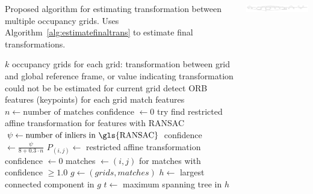 \documentclass[17pt, a0paper, portrait]{tikzposter}
\begin{document}
\begin{columns}
{\begin{algorithm}[H]
    \caption{Proposed algorithm for estimating transformation between multiple occupancy grids. Uses Algorithm~\ref{alg:estimatefinaltrans} to estimate final transformations.}
    \label{alg:estimategridtrasform}
    \begin{algorithmic}[1]
        \Require $k$ occupancy grids
        \Ensure for each grid: transformation between grid and global reference frame, or value indicating transformation could not be be estimated for current grid
            \State detect \gls{ORB} features (keypoints) for each grid
             
                \State match features
                \State $n \gets \text{number of matches}$
                    \State confidence $\gets 0$
                \Else
                    \State try find restricted affine transformation for features with \gls{RANSAC}
                    \State $\psi \gets \text{number of inliers in \gls{RANSAC}}$
                        \State confidence $\gets \frac{\psi}{8 + 0.3 \cdot n}$
                        \State $P_{(i,j)} \gets$ restricted affine transformation
                    \Else
                        \State confidence $\gets 0$
                    \EndIf
                \EndIf
            \EndFor
            \State matches $\gets (i,j)$ for matches with confidence $\ge 1.0$
            \State $g \gets (grids, matches)$
            \State $h \gets$ largest connected component in $g$
            \State $t \gets$ maximum spanning tree in $h$
            \State {} 
        \EndProcedure
    \end{algorithmic}
\end{algorithm}


\begin{tikzfigure}
    \centering
    \includegraphics[width=\linewidth]{../img/matches.pdf}
    \label{fig:matches}
\end{tikzfigure}


}
\end{columns}
\end{document}
